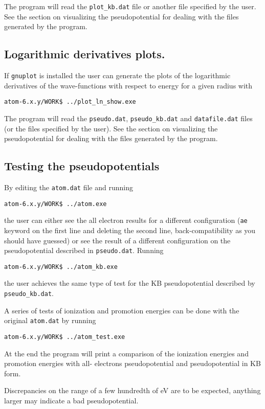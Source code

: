 \documentclass[11pt]{article}
\begin{document}
The program will read the \texttt{plot{\_}kb.dat} file or another file specified by the user.  See the section on
visualizing the pseudopotential for dealing with the files generated by the program.


\subsection{Logarithmic derivatives plots.}
\label{sec:run-show-ln}

If \texttt{gnuplot} is installed the user can generate the plots of the logarithmic derivatives of the
wave-functions with respect to energy for a given radius with

\noindent\texttt{atom-6.x.y/WORK\$ ../plot{\_}ln{\_}show.exe}

The program will read the \texttt{pseudo.dat}, \texttt{pseudo{\_}kb.dat} and \texttt{datafile.dat} files (or the files specified
by the user).   See the section on
visualizing the pseudopotential for dealing with the files generated by the program.


\subsection{Testing the pseudopotentials}
\label{sec:run-test}

By editing the \texttt{atom.dat} file and running

\noindent\texttt{atom-6.x.y/WORK\$ ../atom.exe}

the user can either see the all electron results for a
different configuration (\texttt{ae} keyword on the first line and deleting the second line, back-compatibility
as you should have guessed) or see the result of a different configuration on the pseudopotential
described in \texttt{pseudo.dat}.  Running

\noindent\texttt{atom-6.x.y/WORK\$ ../atom{\_}kb.exe}

the user achieves the same type of test for the KB pseudopotential described by \texttt{pseudo{\_}kb.dat}.

A series of tests of ionization and promotion energies can be done with the original \texttt{atom.dat}
by running

\noindent\texttt{atom-6.x.y/WORK\$ ../atom{\_}test.exe}

At the end the program will print a comparison of the ionization energies and promotion energies
with all- electrons pseudopotential and pseudopotential in KB form.

Discrepancies on the range of a few hundredth of eV are to be expected, anything larger
may indicate a bad pseudopotential.
\end{document}
